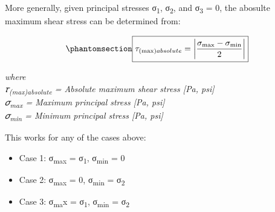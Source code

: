 \documentclass[
  letterpaper,
  DIV=11,
  numbers=noendperiod]{scrreprt}
\theoremstyle{definition}
\theoremstyle{remark}
\begin{document}
More generally, given principal stresses σ\textsubscript{1},
σ\textsubscript{2}, and σ\textsubscript{3} = 0, the abosulte maximum
shear stress can be determined from:

\begin{equation}\phantomsection\label{eq-12.4}{
\boxed{\tau_{(\max)absolute}=\left|\frac{\sigma_{\max }-\sigma_{\min }}{2}\right|}
}\end{equation}

\emph{where}\\
\emph{𝜏\textsubscript{(max)absolute} = Absolute maximum shear stress
{[}Pa, psi{]}}\\
\emph{𝜎\textsubscript{max} = Maximum principal stress {[}Pa, psi{]}}\\
\emph{𝜎\textsubscript{min} = Minimum principal stress {[}Pa, psi{]}}

This works for any of the cases above:

\begin{itemize}
\item
  Case 1: σ\textsubscript{max} = σ\textsubscript{1},
  σ\textsubscript{min} = 0
\item
  Case 2: σ\textsubscript{max} = 0, σ\textsubscript{min} =
  σ\textsubscript{2}
\item
  Case 3: σ\textsubscript{ma}x = σ\textsubscript{1},
  σ\textsubscript{min} = σ\textsubscript{2}
\end{itemize}
\end{document}

